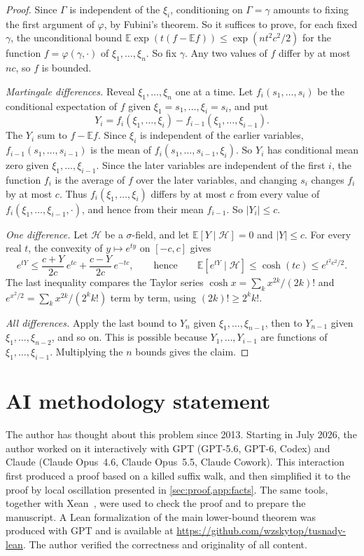 \documentclass[11pt,letterpaper]{article}
\newcommand{\E}{\mathbb{E}}
\newcommand{\1}{\mathbf{1}}
\newcommand{\AIsections}{\cref{sec:proof,app:facts}}
\begin{document}
\begin{proof}
Since $\Gamma$ is independent of the $\xi_i$, conditioning on $\Gamma=\gamma$ amounts to fixing the first argument of $\varphi$, by Fubini's theorem. So it suffices to prove, for each fixed $\gamma$, the unconditional bound \mbox{$\E\exp(t(f-\E f))\le\exp(nt^2c^2/2)$} for the function $f=\varphi(\gamma,\cdot)$ of $\xi_1,\dots,\xi_n$. So fix $\gamma$. Any two values of $f$ differ by at most $nc$, so $f$ is bounded.

\emph{Martingale differences.} Reveal $\xi_1,\dots,\xi_n$ one at a time. Let $f_i(s_1,\dots,s_i)$ be the conditional expectation of $f$ given $\xi_1=s_1,\dots,\xi_i=s_i$, and put
\[
Y_i=f_i(\xi_1,\dots,\xi_i)-f_{i-1}(\xi_1,\dots,\xi_{i-1}).
\]
The $Y_i$ sum to $f-\E f$. Since $\xi_i$ is independent of the earlier variables, $f_{i-1}(s_1,\dots,s_{i-1})$ is the mean of $f_i(s_1,\dots,s_{i-1},\xi_i)$. So $Y_i$ has conditional mean zero given $\xi_1,\dots,\xi_{i-1}$. Since the later variables are independent of the first $i$, the function $f_i$ is the average of $f$ over the later variables, and changing $s_i$ changes $f_i$ by at most $c$. Thus $f_i(\xi_1,\dots,\xi_i)$ differs by at most $c$ from every value of $f_i(\xi_1,\dots,\xi_{i-1},\cdot)$, and hence from their mean $f_{i-1}$. So $|Y_i|\le c$.

\emph{One difference.} Let $\mathcal H$ be a $\sigma$-field, and let $\E[Y\mid\mathcal H]=0$ and $|Y|\le c$. For every real $t$, the convexity of $y\mapsto e^{ty}$ on $[-c,c]$ gives
\[
e^{tY}\le\frac{c+Y}{2c}\,e^{tc}+\frac{c-Y}{2c}\,e^{-tc},\qquad\text{hence}\qquad\E[e^{tY}\mid\mathcal H]\le\cosh(tc)\le e^{t^2c^2/2}.
\]
The last inequality compares the Taylor series $\cosh x=\sum_kx^{2k}/(2k)!$ and $e^{x^2/2}=\sum_kx^{2k}/(2^kk!)$ term by term, using $(2k)!\ge2^kk!$.

\emph{All differences.} Apply the last bound to $Y_n$ given $\xi_1,\dots,\xi_{n-1}$, then to $Y_{n-1}$ given $\xi_1,\dots,\xi_{n-2}$, and so on. This is possible because $Y_1,\dots,Y_{i-1}$ are functions of $\xi_1,\dots,\xi_{i-1}$. Multiplying the $n$ bounds gives the claim.
\end{proof}

\section*{AI methodology statement}
The author has thought about this problem since 2013. Starting in July 2026, the author worked on it interactively with GPT (GPT-5.6, GPT-6, Codex) and Claude (Claude Opus~4.6, Claude Opus~5.5, Claude Cowork). This interaction first produced a proof based on a killed suffix walk, and then simplified it to the proof by local oscillation presented in \AIsections. The same tools, together with Xean~\cite{Xu26}, were used to check the proof and to prepare the manuscript. A Lean formalization of the main lower-bound theorem was produced with GPT and is available at \url{https://github.com/wzskytop/tusnady-lean}. The author verified the correctness and originality of all content.
\end{document}
